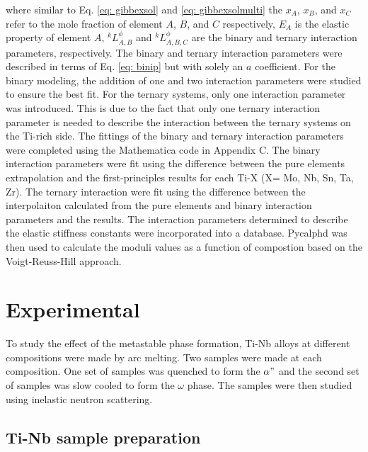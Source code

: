 \noindent where similar to Eq. \ref{eq: gibbexsol} and \ref{eq: gibbexsolmulti} the $x_A$, $x_B$, and $x_C$ refer to the mole fraction of element $A$, $B$, and $C$ respectively, $E_{A}$ is the elastic property of element $A$, $^{k}L_{A,B}^{\phi}$ and $^{k}L_{A,B,C}^{\phi}$ are the binary and ternary interaction parameters, respectively. The binary and ternary interaction parameters were described in terms of Eq. \ref{eq: binip} but with solely an $a$ coefficient. For the binary modeling, the addition of one and two interaction parameters were studied to ensure the best fit. For the ternary systems, only one interaction parameter was introduced. This is due to the fact that only one ternary interaction parameter is needed to describe the interaction between the ternary systems on the Ti-rich side. The fittings of the binary and ternary interaction parameters were completed using the Mathematica code in Appendix C. The binary interaction parameters were fit using the difference between the pure elements extrapolation and the first-principles results for each Ti-X (X= Mo, Nb, Sn, Ta, Zr). The ternary interaction were fit using the difference between the interpolaiton calculated from the pure elements and binary interaction parameters and the results. The interaction parameters determined to describe the elastic stiffness constants were incorporated into a database. Pycalphd \cite{Otis2017} was then used to calculate the moduli values as a function of compostion based on the Voigt-Reuss-Hill approach.


\section{Experimental}

To study the effect of the metastable phase formation, Ti-Nb alloys at different compositions were made by arc melting. Two samples were made at each composition. One set of samples was quenched to form the $\alpha"$ and the second set of samples was slow cooled to form the $\omega$ phase. The samples were then studied using inelastic neutron scattering. 

\subsection{Ti-Nb sample preparation}

